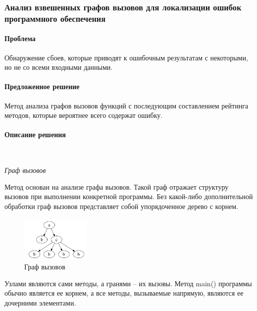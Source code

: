 \def\notedate{2021.11.10}
\def\currentauthor{Крехтунова Д.Д. (РК6-73Б)}

\subsubsection{Анализ взвешенных графов вызовов для локализации ошибок программного обеспечения \cite{Eichinger2008}}

\paragraph{Проблема}

Обнаружение сбоев, которые приводят к ошибочным результатам с некоторыми, но не со всеми входными данными.

\paragraph{Предложенное решение}

Метод анализа графов вызовов функций с последующим составлением рейтинга методов, которые вероятнее всего содержат ошибку. 

\paragraph{Описание решения}\

\textit{Граф вызовов}\

Метод основан на анализе графа вызовов. Такой граф отражает структуру вызовов при выполнении конкретной программы. Без какой-либо дополнительной обработки граф вызовов представляет собой упорядоченное дерево с корнем.

\begin{figure}[h]
	\centering
	\includegraphics[width=0.3\textwidth]{ResearchNotes/rndhpc_not_edt_2021_11_10/krekhtunova/graph.png}
	\caption{Граф вызовов} 
\end{figure}

Узлами являются сами методы, а гранями -- их вызовы. Метод main() программы обычно является ее корнем, а все методы, вызываемые напрямую, являются ее дочерними элементами.
\newline

